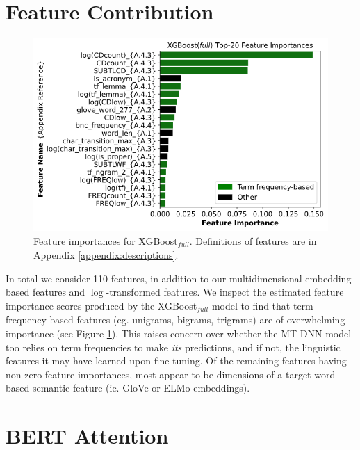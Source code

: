 \documentclass{dcthesis}
\theoremstyle{definition}
\theoremstyle{remark}
\begin{document}
\section{Feature Contribution}

\begin{figure}
  \centering
  \includegraphics[scale=0.6]{xgboost_feature_importances.png}
  \captionsetup{justification=centering}
  \caption{\label{fig:xgboost_feature_importance} Feature importances for XGBoost$_\textit{full}$. Definitions of features are in Appendix \ref{appendix:descriptions}.}
\end{figure}

In total we consider 110 features, in addition to our multidimensional embedding-based features and $\log$-transformed features. We inspect the estimated feature importance scores produced by the XGBoost$_\textit{full}$ model to find that term frequency-based features (eg. unigrams, bigrams, trigrams) are of overwhelming importance (see Figure \ref{fig:xgboost_feature_importance}). This raises concern over whether the MT-DNN model too relies on term frequencies to make \textit{its} predictions, and if not, the linguistic features it may have learned upon fine-tuning. Of the remaining features having non-zero feature importances, most appear to be dimensions of a target word-based semantic feature (ie. GloVe or ELMo embeddings).

\section{BERT Attention}
\label{sec:bert_attention}
\end{document}
